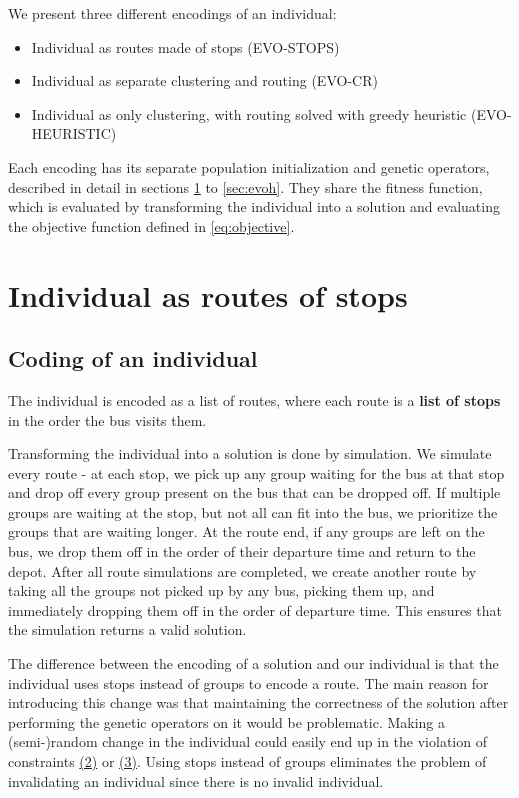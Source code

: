\hspace{0pt}

We present three different encodings of an individual:

\begin{itemize}
    \item Individual as routes made of stops (EVO-STOPS)
    \item Individual as separate clustering and routing (EVO-CR)
    \item Individual as only clustering, with routing solved with greedy heuristic (EVO-HEURISTIC)
\end{itemize}

Each encoding has its separate population initialization and genetic operators, described in detail in sections \ref{sec:evo-stops} to \ref{sec:evoh}. They share the fitness function, which is evaluated by transforming the individual into a solution and evaluating the objective function defined in \ref{eq:objective}.

\section{Individual as routes of stops}\label{sec:evo-stops}

\subsection{Coding of an individual}

The individual is encoded as a list of routes, where each route is a \textbf{list of stops} in the order the bus visits them.

Transforming the individual into a solution is done by simulation.  We simulate every route - at each stop, we pick up any group waiting for the bus at that stop and drop off every group present on the bus that can be dropped off. If multiple groups are waiting at the stop, but not all can fit into the bus, we prioritize the groups that are waiting longer. At the route end, if any groups are left on the bus, we drop them off in the order of their departure time and return to the depot. After all route simulations are completed, we create another route by taking all the groups not picked up by any bus, picking them up, and immediately dropping them off in the order of departure time. This ensures that the simulation returns a valid solution.

The difference between the encoding of a solution and our individual is that the individual uses stops instead of groups to encode a route. The main reason for introducing this change was that maintaining the correctness of the solution after performing the genetic operators on it would be problematic. Making a (semi-)random change in the individual could easily end up in the violation of constraints \hyperref[constraints]{(2)} or \hyperref[constraints]{(3)}. Using stops instead of groups eliminates the problem of invalidating an individual since there is no invalid individual.

